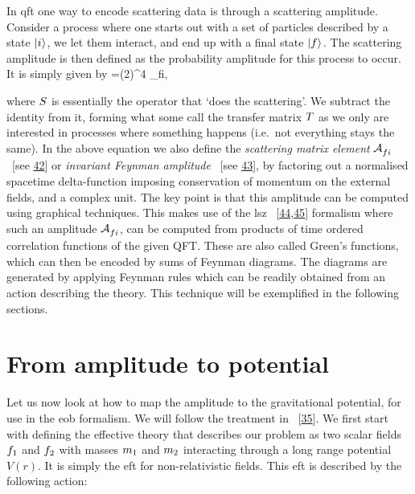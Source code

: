\documentclass[
  10pt,
  a4paper,
  DIV=11,
  numbers=noendperiod,
  twoside]{scrreprt}
\let\[\relax \let\]\relax %
\DeclareRobustCommand{\[}{\begin{equation}}
\DeclareRobustCommand{\]}{\end{equation}}
\begin{document}
In \gls{qft} one way to encode scattering data is through a scattering
amplitude. Consider a process where one starts out with a set of
particles described by a state \(\ket{i}\), we let them interact, and
end up with a final state \(\ket{f}\). The scattering amplitude is then
defined as the probability amplitude for this process to occur. It is
simply given by
\[=(2\pi)^4 \im \ampl_{fi},\]

where \(\Smat\) is essentially the operator that `does the scattering'.
We subtract the identity from it, forming what some call the transfer
matrix \(\Tmat\) as we only are interested in processes where something
happens (i.e.~not everything stays the same). In the above equation we
also define the \emph{scattering matrix element} \(\ampl_{fi}\) ~{[}see
\protect\hyperlink{ref-Srednicki:2007}{42}{]} or \emph{invariant Feynman
amplitude} ~{[}see \protect\hyperlink{ref-Coleman:2018a}{43}{]}, by
factoring out a normalised spacetime delta-function imposing
conservation of momentum on the external fields, and a complex unit. The
key point is that this amplitude can be computed using graphical
techniques. This makes use of the \gls{lsz}
~{[}\protect\hyperlink{ref-Lehmann:1954rq}{44},\protect\hyperlink{ref-Collins:2019ozc}{45}{]}
formalism where such an amplitude \(\ampl_{fi}\), can be computed from
products of time ordered correlation functions of the given QFT. These
are also called Green's functions, which can then be encoded by sums of
Feynman diagrams. The diagrams are generated by applying Feynman rules
which can be readily obtained from an action describing the theory. This
technique will be exemplified in the following sections.

\hypertarget{sec-amp2pot}{%
\section{From amplitude to potential}\label{sec-amp2pot}}

Let us now look at how to map the amplitude to the gravitational
potential, for use in the \gls{eob} formalism. We will follow the
treatment in ~{[}\protect\hyperlink{ref-Cheung:2018wkq}{35}{]}. We first
start with defining the effective theory that describes our problem as
two scalar fields \(\wf[1]\) and \(\wf[2]\) with masses \(\mass[1]\) and
\(\mass[2]\) interacting through a long range potential \(V(r)\). It is
simply the \gls{eft} for non-relativistic fields. This \gls{eft} is
described by the following action:
\end{document}
